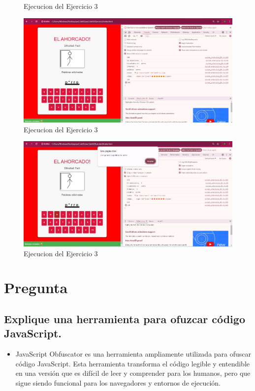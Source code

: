 \documentclass{article}
\begin{document}
\begin{itemize}
\begin{figure}[H]
            \caption{Ejecucion del Ejercicio 3}
            \label{fig:pagina}
        \end{figure}
        		\begin{figure}[H]
            \centering
            \includegraphics[width=\textwidth]{img/pag6}
            \caption{Ejecucion del Ejercicio 3}
            \label{fig:pagina}
        \end{figure}
        		\begin{figure}[H]
            \centering
            \includegraphics[width=\textwidth]{img/pag7}
            \caption{Ejecucion del Ejercicio 3}
            \label{fig:pagina}
        \end{figure}
	\end{itemize}
\section{Pregunta}
	\subsection{Explique una herramienta para ofuzcar código JavaScript.}
	\begin{itemize}	
		\item JavaScript Obfuscator es una herramienta ampliamente utilizada para ofuscar código JavaScript. Esta
herramienta transforma el código legible y entendible en una versión que es difícil de leer y comprender
para los humanos, pero que sigue siendo funcional para los navegadores y entornos de ejecución.

	\end{itemize}
\end{document}
